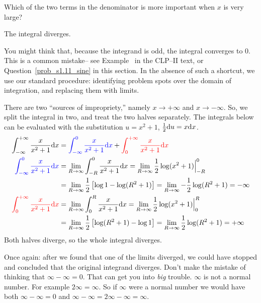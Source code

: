 \begin{hint}
Which of the two terms in the denominator is more important when $x$
is very large?
\end{hint}

\begin{answer}
The integral diverges.
\end{answer}

\begin{solution}
You might think that, because the integrand is odd, the integral
converges to $0$. This is a common mistake-- see Example~ in the
CLP--II text, or Question~\ref{prob_s1.11_sine} in this section.  In the absence of such a shortcut, we use our standard procedure: identifying problem spots over the domain of integration, and replacing them with limits.

There are two ``sources
of impropriety,'' namely $x\to +\infty$ and $x\to -\infty$.
So, we split the integral in two, and treat the two halves separately. The integrals below can be evaluated with the substitution $u=x^2+1$, $\frac{1}{2}\mathrm{d}u = x\mathrm{d}x$.
\begin{align*}
\int_{-\infty}^{+\infty}\frac{x}{x^2+1}\mathrm{d}x
  &=\textcolor{blue}{ \int_{-\infty}^0\frac{x}{x^2+1}\mathrm{d}x}
   + \textcolor{red}{\int_0^{+\infty}\frac{x}{x^2+1}\mathrm{d}x}\\
\color{blue}\int_{-\infty}^0\frac{x}{x^2+1}\mathrm{d}x
&=\lim_{R\rightarrow\infty}\int_{-R}^0\frac{x}{x^2+1}\mathrm{d}x
=\lim_{R\rightarrow\infty}\frac{1}{2}\log(x^2+1)\Big|_{-R}^0\\
&=\lim_{R \to \infty}\frac{1}{2}\left[\log 1-\log(R^2+1)\right]=\lim_{R\rightarrow\infty}-\frac{1}{2}\log(R^2+1)
=-\infty
\\
\color{red}\int_0^{+\infty}\frac{x}{x^2+1}\mathrm{d}x
&=\lim_{R\rightarrow\infty}\int_0^R\frac{x}{x^2+1}\mathrm{d}x
=\lim_{R\rightarrow\infty}\frac{1}{2}\log(x^2+1)\Big|_0^R\\
&=\lim_{R \to \infty}\frac{1}{2}\left[ \log(R^2+1)-\log 1\right]
=\lim_{R\rightarrow\infty}\frac{1}{2}\log(R^2+1)
=+\infty
\end{align*}
Both halves diverge, so the whole integral diverges.

Once again: after we found that one of the limits diverged, we could have stopped and concluded that the original integrand diverges. Don't make
the mistake of thinking that $\infty-\infty=0$. That can get you into
\emph{big} trouble. $\infty$ is not a normal number. For
example $2\infty=\infty$. So if $\infty$ were a normal number we would have
both $\infty-\infty=0$ and $\infty-\infty=2\infty-\infty =\infty$.
\end{solution}

